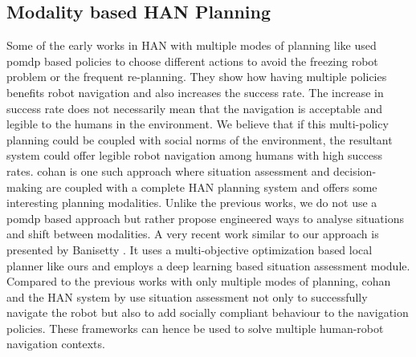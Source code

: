 \subsection{Modality based HAN Planning}
Some of the early works in HAN with multiple modes of planning like \cite{qian2013decision, mehta2016autonomous} used \acrshort{pomdp} based policies to choose different actions to avoid the freezing robot problem or the frequent re-planning. They show how having multiple policies benefits robot navigation and also increases the success rate. The increase in success rate does not necessarily mean that the navigation is acceptable and legible to the humans in the environment. We believe that if this multi-policy planning could be coupled with social norms of the environment, the resultant system could offer legible robot navigation among humans with high success rates. \acrshort{cohan} is one such approach where situation assessment and decision-making are coupled with a complete HAN planning system and offers some interesting planning modalities. Unlike the previous works, we do not use a \acrshort{pomdp} based approach but rather propose engineered ways to analyse situations and shift between modalities. A very recent work similar to our approach is presented by Banisetty  \cite{banisetty2020deep}. It uses a multi-objective optimization based local planner like ours and employs a deep learning based situation assessment module. Compared to the previous works with only multiple modes of planning, \acrshort{cohan} and the HAN system by \cite{banisetty2020deep} use situation assessment not only to successfully navigate the robot but also to add socially compliant behaviour to the navigation policies. These frameworks can hence be used to solve multiple human-robot navigation contexts.

